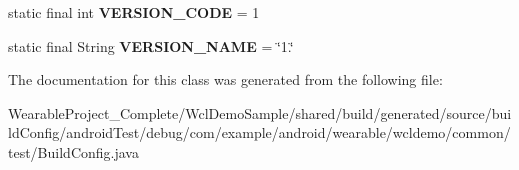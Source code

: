 \begin{DoxyCompactItemize}
\item 
static final int {\bfseries V\+E\+R\+S\+I\+O\+N\+\_\+\+C\+O\+DE} = 1\hypertarget{classcom_1_1example_1_1android_1_1wearable_1_1wcldemo_1_1common_1_1test_1_1BuildConfig_afc05297a63a721e9471d163ecb07147f}{}\label{classcom_1_1example_1_1android_1_1wearable_1_1wcldemo_1_1common_1_1test_1_1BuildConfig_afc05297a63a721e9471d163ecb07147f}

\item 
static final String {\bfseries V\+E\+R\+S\+I\+O\+N\+\_\+\+N\+A\+ME} = \char`\"{}1.\char`\"{}\hypertarget{classcom_1_1example_1_1android_1_1wearable_1_1wcldemo_1_1common_1_1test_1_1BuildConfig_a8f6dd69b283d1185d1e04ebb6b268148}{}\label{classcom_1_1example_1_1android_1_1wearable_1_1wcldemo_1_1common_1_1test_1_1BuildConfig_a8f6dd69b283d1185d1e04ebb6b268148}

\end{DoxyCompactItemize}


The documentation for this class was generated from the following file\+:\begin{DoxyCompactItemize}
\item 
Wearable\+Project\+\_\+\+Complete/\+Wcl\+Demo\+Sample/shared/build/generated/source/build\+Config/android\+Test/debug/com/example/android/wearable/wcldemo/common/test/Build\+Config.\+java\end{DoxyCompactItemize}
